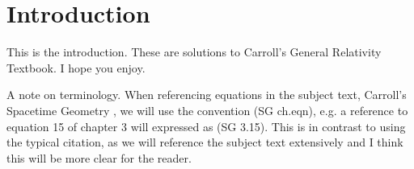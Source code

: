 \chapter*{Introduction}
\label{intro}

This is the introduction. These are solutions to Carroll's General Relativity Textbook. I hope you enjoy. 

A note on terminology. When referencing equations in the subject text, Carroll's Spacetime Geometry \cite{carroll2003spacetime}, we will use the convention (SG ch.eqn), e.g. a reference to equation 15 of chapter 3 will expressed as (SG 3.15). This is in contrast to using the typical citation, as we will reference the subject text extensively and I think this will be more clear for the reader.

